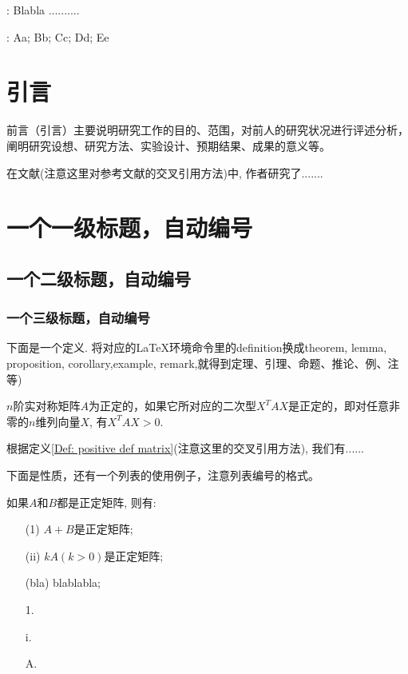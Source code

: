\documentclass[UTF8,oneside,12pt]{article}
\newcommand{\wuhao}{\fontsize{10.5pt}{\baselineskip}\selectfont}
\theoremstyle{DingLi}
\numberwithin{equation}{section}
\newtheorem{definition}{\hskip 2em 定义}
\newtheorem{property}{\hskip 2em 性质}
\begin{document}
{\wuhao
{}
:
Blabla ..........

:
Aa;  Bb;  Cc;  Dd;  Ee

}
\section{引言}

前言（引言）主要说明研究工作的目的、范围，对前人的研究状况进行评述分析，阐明研究设想、研究方法、实验设计、预期结果、成果的意义等。

在文献\cite{Liang-Xu-Auto18}(\textcolor[rgb]{1.00,0.00,0.00}{注意这里对参考文献的交叉引用方法})中, 作者研究了.......


\section{一个一级标题，自动编号}

\subsection{一个二级标题，自动编号}

\subsubsection{一个三级标题，自动编号}


下面是一个定义. 将对应的\LaTeX{}环境命令里的definition换成theorem, lemma, proposition, corollary,example, remark,就得到定理、引理、命题、推论、例、注等)
\begin{definition}\label{Def: positive def matrix}
$n$阶实对称矩阵$A$为正定的，如果它所对应的二次型$X^T A X$是正定的，即对任意非零的$n$维列向量$X$, 有$X^T A X>0$.
\end{definition}



根据定义\ref{Def: positive def matrix}(\textcolor[rgb]{1.00,0.00,0.00}{注意这里的交叉引用方法}), 我们有......

下面是性质，还有一个列表的使用例子，注意列表编号的格式。
\begin{property}\label{Property: positive matrix}
如果$A$和$B$都是正定矩阵, 则有:
\begin{itemize}
  \item[(1)]$A+B$是正定矩阵;
  \item[(ii)]$kA$$(k>0)$是正定矩阵;
  \item[(bla)]blablabla;
  \item[1.]
  \item[i.]
  \item[A.]
\end{itemize}
\end{property}
\end{document}

